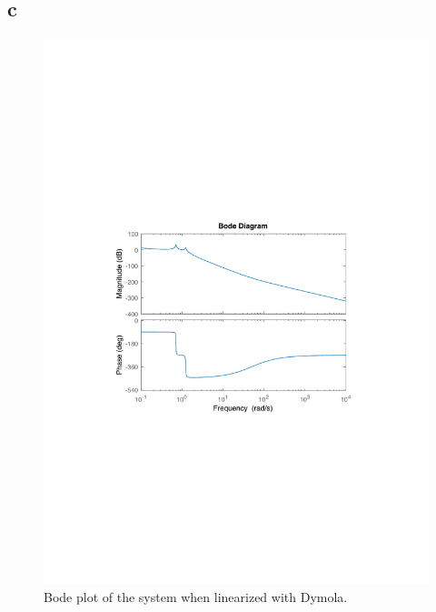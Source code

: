 \documentclass{article}
\begin{document}
\subsection{c}

\begin{figure}[h]
    \centering
    \includegraphics[width = \textwidth]{ex1_3c_bode}
    \caption{Bode plot of the system when linearized with Dymola.}
    \label{fig:bodeDymola} 
\end{figure}
\end{document}
